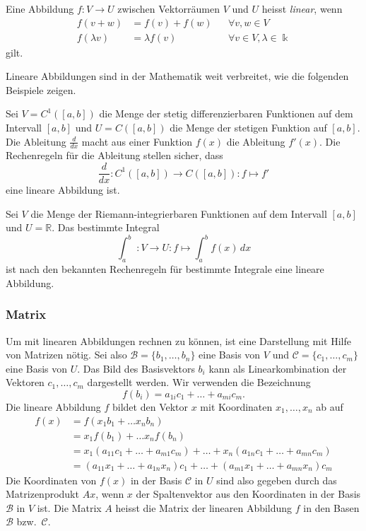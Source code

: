 \begin{definition}
%
Eine Abbildung $f\colon V\to U$ zwischen Vektorräumen $V$ und $U$
heisst {\em linear}, wenn
\[
\begin{aligned}
f(v+w) &= f(v) + f(w)&&\forall v,w\in V
\\
f(\lambda v) &= \lambda f(v) &&\forall v\in V,\lambda \in \Bbbk
\end{aligned}
\]
gilt.
\end{definition}

Lineare Abbildungen sind in der Mathematik weit verbreitet, wie die
folgenden Beispiele zeigen.

\begin{beispiel}
Sei $V=C^1([a,b])$ die Menge der stetig differenzierbaren Funktionen
auf dem Intervall $[a,b]$ und $U=C([a,b])$ die Menge der
stetigen Funktion auf $[a,b]$.
Die Ableitung $\frac{d}{dx}$ macht aus einer Funktion $f(x)$ die
Ableitung $f'(x)$.
Die Rechenregeln für die Ableitung stellen sicher, dass
\[
\frac{d}{dx}
\colon
C^1([a,b]) \to  C([a,b])
:
f \mapsto f'
\]
eine lineare Abbildung ist.
\end{beispiel}

\begin{beispiel}
Sei $V$ die Menge der Riemann-integrierbaren Funktionen auf dem
Intervall $[a,b]$ und $U=\mathbb{R}$.
Das bestimmte Integral
\[
\int_a^b \;\colon V \to U : f \mapsto \int_a^b f(x)\,dx
\]
ist nach den bekannten Rechenregeln für bestimmte Integrale
eine lineare Abbildung.
\end{beispiel}

\subsubsection{Matrix}
Um mit linearen Abbildungen rechnen zu können, ist eine Darstellung
mit Hilfe von Matrizen nötig.
Sei also $\mathcal{B}=\{b_1,\dots,b_n\}$ eine Basis von $V$ und
$\mathcal{C} = \{ c_1,\dots,c_m\}$ eine Basis von $U$.
Das Bild des Basisvektors $b_i$ kann als Linearkombination der
Vektoren $c_1,\dots,c_m$ dargestellt werden.
Wir verwenden die Bezeichnung
\[
f(b_i)
=
a_{1i} c_1 + \dots + a_{mi} c_m.
\]
Die lineare Abbildung $f$ bildet den Vektor $x$ mit Koordinaten
$x_1,\dots,x_n$ ab auf
\begin{align*}
f(x)
&=
f(x_1b_1  + \dots x_nb_n)
\\
&=
x_1 f(b_1) + \dots x_nf(b_n)
\\
&=
x_1(a_{11} c_1 + \dots + a_{m1} c_m)
+
\dots
+
x_n(a_{1n} c_1 + \dots + a_{mn} c_m)
\\
&=
( a_{11} x_1 + \dots + a_{1n} x_n ) c_1
+
\dots
+
( a_{m1} x_1 + \dots + a_{mn} x_n ) c_m
\end{align*}
Die Koordinaten von $f(x)$ in der Basis $\mathcal{C}$ in $U$ sind
also gegeben durch das Matrizenprodukt $Ax$, wenn $x$ der Spaltenvektor
aus den Koordinaten in der Basis $\mathcal{B}$ in $V$ ist.
Die Matrix $A$ heisst die Matrix der linearen Abbildung $f$ in
den Basen $\mathcal{B}$ bzw.~$\mathcal{C}$.
%


